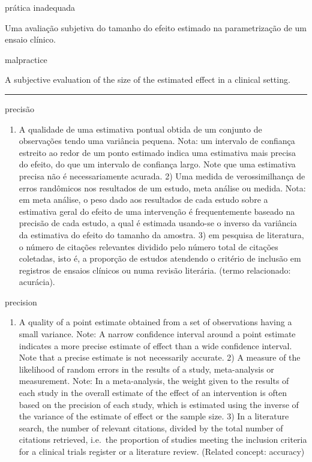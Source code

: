 \documentclass[
]{book}
\providecommand{\tightlist}{%
  \setlength{\itemsep}{0pt}\setlength{\parskip}{0pt}}
\begin{document}
prática inadequada

Uma avaliação subjetiva do tamanho do efeito estimado na parametrização de um ensaio clínico.

malpractice

A subjective evaluation of the size of the estimated effect in a clinical setting.

\begin{center}\rule{0.5\linewidth}{0.5pt}\end{center}

precisão

\begin{enumerate}
\def\labelenumi{\arabic{enumi})}
\tightlist
\item
  A qualidade de uma estimativa pontual obtida de um conjunto de observações tendo uma variância pequena. Nota: um intervalo de confiança estreito ao redor de um ponto estimado indica uma estimativa mais precisa do efeito, do que um intervalo de confiança largo. Note que uma estimativa precisa não é necessariamente acurada. 2) Uma medida de verossimilhança de erros randômicos nos resultados de um estudo, meta análise ou medida. Nota: em meta análise, o peso dado aos resultados de cada estudo sobre a estimativa geral do efeito de uma intervenção é frequentemente baseado na precisão de cada estudo, a qual é estimada usando-se o inverso da variância da estimativa do efeito do tamanho da amostra. 3) em pesquisa de literatura, o número de citações relevantes dividido pelo número total de citações coletadas, isto é, a proporção de estudos atendendo o critério de inclusão em registros de ensaios clínicos ou numa revisão literária. (termo relacionado: acurácia).
\end{enumerate}

precision

\begin{enumerate}
\def\labelenumi{\arabic{enumi})}
\tightlist
\item
  A quality of a point estimate obtained from a set of observations having a small variance. Note: A narrow confidence interval around a point estimate indicates a more precise estimate of effect than a wide confidence interval. Note that a precise estimate is not necessarily accurate. 2) A measure of the likelihood of random errors in the results of a study, meta-analysis or measurement. Note: In a meta-analysis, the weight given to the results of each study in the overall estimate of the effect of an intervention is often based on the precision of each study, which is estimated using the inverse of the variance of the estimate of effect or the sample size. 3) In a literature search, the number of relevant citations, divided by the total number of citations retrieved, i.e.~the proportion of studies meeting the inclusion criteria for a clinical trials register or a literature review. (Related concept: accuracy)
\end{enumerate}
\end{document}
